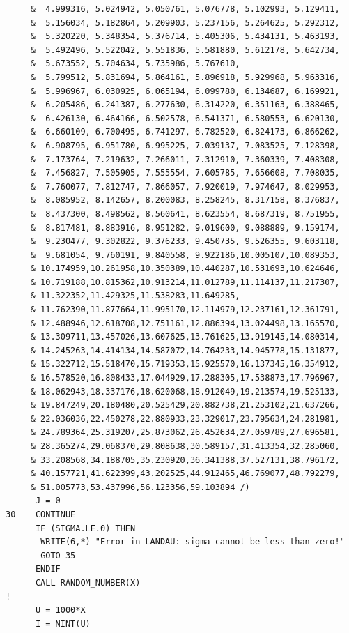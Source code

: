 \begin{lstlisting}
     &  4.999316, 5.024942, 5.050761, 5.076778, 5.102993, 5.129411,
     &  5.156034, 5.182864, 5.209903, 5.237156, 5.264625, 5.292312,
     &  5.320220, 5.348354, 5.376714, 5.405306, 5.434131, 5.463193,
     &  5.492496, 5.522042, 5.551836, 5.581880, 5.612178, 5.642734,
     &  5.673552, 5.704634, 5.735986, 5.767610,
     &  5.799512, 5.831694, 5.864161, 5.896918, 5.929968, 5.963316,
     &  5.996967, 6.030925, 6.065194, 6.099780, 6.134687, 6.169921,
     &  6.205486, 6.241387, 6.277630, 6.314220, 6.351163, 6.388465,
     &  6.426130, 6.464166, 6.502578, 6.541371, 6.580553, 6.620130,
     &  6.660109, 6.700495, 6.741297, 6.782520, 6.824173, 6.866262,
     &  6.908795, 6.951780, 6.995225, 7.039137, 7.083525, 7.128398,
     &  7.173764, 7.219632, 7.266011, 7.312910, 7.360339, 7.408308,
     &  7.456827, 7.505905, 7.555554, 7.605785, 7.656608, 7.708035,
     &  7.760077, 7.812747, 7.866057, 7.920019, 7.974647, 8.029953,
     &  8.085952, 8.142657, 8.200083, 8.258245, 8.317158, 8.376837,
     &  8.437300, 8.498562, 8.560641, 8.623554, 8.687319, 8.751955,
     &  8.817481, 8.883916, 8.951282, 9.019600, 9.088889, 9.159174,
     &  9.230477, 9.302822, 9.376233, 9.450735, 9.526355, 9.603118,
     &  9.681054, 9.760191, 9.840558, 9.922186,10.005107,10.089353,
     & 10.174959,10.261958,10.350389,10.440287,10.531693,10.624646,
     & 10.719188,10.815362,10.913214,11.012789,11.114137,11.217307,
     & 11.322352,11.429325,11.538283,11.649285,
     & 11.762390,11.877664,11.995170,12.114979,12.237161,12.361791,
     & 12.488946,12.618708,12.751161,12.886394,13.024498,13.165570,
     & 13.309711,13.457026,13.607625,13.761625,13.919145,14.080314,
     & 14.245263,14.414134,14.587072,14.764233,14.945778,15.131877,
     & 15.322712,15.518470,15.719353,15.925570,16.137345,16.354912,
     & 16.578520,16.808433,17.044929,17.288305,17.538873,17.796967,
     & 18.062943,18.337176,18.620068,18.912049,19.213574,19.525133,
     & 19.847249,20.180480,20.525429,20.882738,21.253102,21.637266,
     & 22.036036,22.450278,22.880933,23.329017,23.795634,24.281981,
     & 24.789364,25.319207,25.873062,26.452634,27.059789,27.696581,
     & 28.365274,29.068370,29.808638,30.589157,31.413354,32.285060,
     & 33.208568,34.188705,35.230920,36.341388,37.527131,38.796172,
     & 40.157721,41.622399,43.202525,44.912465,46.769077,48.792279,
     & 51.005773,53.437996,56.123356,59.103894 /)
      J = 0
30    CONTINUE
      IF (SIGMA.LE.0) THEN 
       WRITE(6,*) "Error in LANDAU: sigma cannot be less than zero!"
       GOTO 35
      ENDIF
      CALL RANDOM_NUMBER(X)
!
      U = 1000*X
      I = NINT(U)

\end{lstlisting}

